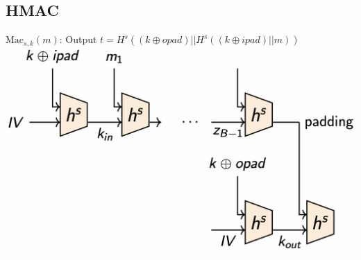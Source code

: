 \subsection*{HMAC}
$\text{Mac}_{s,k}(m)$:
Output $t=H^{s}((k\oplus opad)||H^s((k\oplus ipad)||m))$
\includegraphics[width=\columnwidth]{HMAC.png}